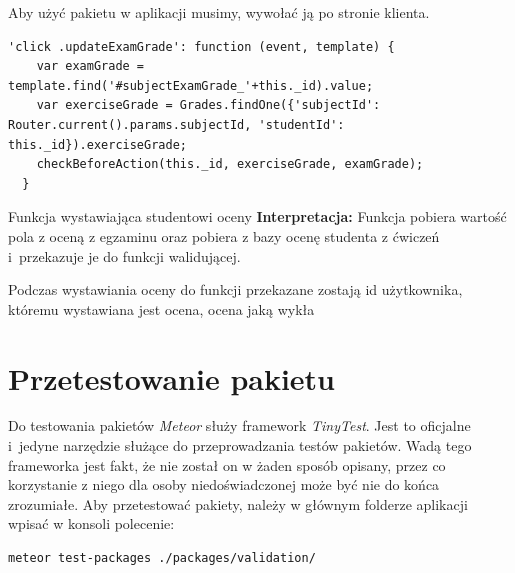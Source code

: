 \documentclass[openright]{xmgr}
\begin{document}
Aby użyć pakietu w aplikacji musimy, wywołać ją po stronie klienta.

\begin{listing}[H]
\begin{verbatim}
'click .updateExamGrade': function (event, template) {
    var examGrade = template.find('#subjectExamGrade_'+this._id).value;
    var exerciseGrade = Grades.findOne({'subjectId': Router.current().params.subjectId, 'studentId': this._id}).exerciseGrade;
    checkBeforeAction(this._id, exerciseGrade, examGrade);
  }
\end{verbatim}
\caption{Funkcja wystawiająca studentowi oceny \newline \newline \hspace{\linewidth} \textbf{Interpretacja:} Funkcja pobiera wartość pola z oceną z egzaminu oraz pobiera z bazy ocenę studenta z ćwiczeń i~przekazuje je do funkcji walidującej. \newline}
\end{listing}

Podczas wystawiania oceny do funkcji przekazane zostają id użytkownika, któremu wystawiana jest ocena, ocena jaką wykła%

\section{Przetestowanie pakietu}

Do testowania pakietów \textit{Meteor} służy framework \textit{TinyTest}. Jest to oficjalne i~jedyne narzędzie służące do przeprowadzania testów pakietów. Wadą tego frameworka jest fakt, że nie został on w żaden sposób opisany, przez co korzystanie z niego dla osoby niedoświadczonej może być nie do końca zrozumiałe.
\newline \newline
Aby przetestować pakiety, należy w głównym folderze aplikacji wpisać w konsoli polecenie:

\begin{lstlisting}[language=bash]
meteor test-packages ./packages/validation/
\end{lstlisting}
\end{document}
